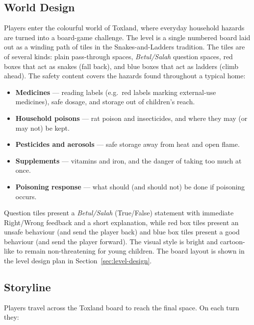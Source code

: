 \documentclass[a4paper,12pt]{article}
\begin{document}
\subsection{World Design}

Players enter the colourful world of Toxland, where everyday household hazards are turned into a board-game challenge. The level is a single numbered board laid out as a winding path of tiles in the Snakes-and-Ladders tradition. The tiles are of several kinds: plain pass-through spaces, \emph{Betul/Salah} question spaces, red boxes that act as snakes (fall back), and blue boxes that act as ladders (climb ahead). The safety content covers the hazards found throughout a typical home:

\begin{itemize}
  \item \textbf{Medicines} --- reading labels (e.g.\ red labels marking external-use medicines), safe dosage, and storage out of children's reach.
  \item \textbf{Household poisons} --- rat poison and insecticides, and where they may (or may not) be kept.
  \item \textbf{Pesticides and aerosols} --- safe storage away from heat and open flame.
  \item \textbf{Supplements} --- vitamins and iron, and the danger of taking too much at once.
  \item \textbf{Poisoning response} --- what should (and should not) be done if poisoning occurs.
\end{itemize}

Question tiles present a \emph{Betul/Salah} (True/False) statement with immediate Right/Wrong feedback and a short explanation, while red box tiles present an unsafe behaviour (and send the player back) and blue box tiles present a good behaviour (and send the player forward). The visual style is bright and cartoon-like to remain non-threatening for young children. The board layout is shown in the level design plan in Section~\ref{sec:level-design}.

\subsection{Storyline}

Players travel across the Toxland board to reach the final space. On each turn they:
\end{document}
